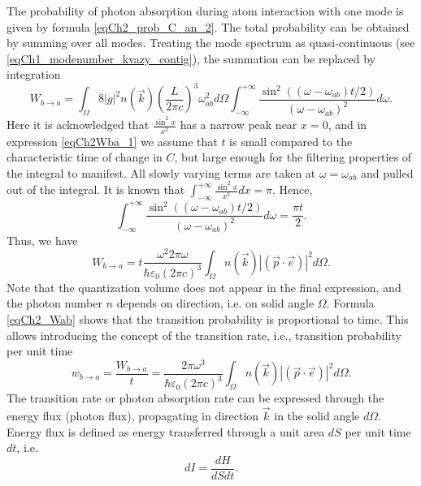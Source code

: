 The probability of photon absorption  during atom interaction with one mode
is given by formula \eqref{eqCh2_prob_C_an_2}. The total probability can
be obtained by summing over all modes. Treating the mode spectrum
as quasi-continuous (see \eqref{eqCh1_modenumber_kvazy_contig}),
the summation can be replaced by integration
\begin{equation}
W_{b \rightarrow a} = \int_{\Omega} 8 \left|g\right|^2 n(\vec{k})
\left(\frac{L}{2 \pi c}\right)^3 \omega_{ab}^2 d \Omega 
\int_{-\infty}^{+\infty} 
\frac{\sin^2\left(\left(\omega - 
  \omega_{ab}\right)t/2\right)} {\left(\omega - 
  \omega_{ab}\right)^2} d \omega.
\label{eqCh2Wba_1}
\end{equation}
Here it is acknowledged that $\frac{\sin^2 x}{x^2}$ has a narrow peak near $x = 0$, and in expression \eqref{eqCh2Wba_1} we assume that $t$ is small compared to the characteristic time of change in $C$, but large enough for the filtering properties of the integral to manifest. All slowly varying terms are taken at $\omega = \omega_{ab}$ and pulled out of the integral. It is known that $\int_{-\infty}^{+\infty} \frac{\sin^2 x}{x^2} dx = \pi$. Hence,
\[
\int_{-\infty}^{+\infty} \frac{\sin^2\left(\left(\omega - 
  \omega_{ab}\right)t/2\right)} {\left(\omega - 
  \omega_{ab}\right)^2} d \omega = \frac{\pi t }{2}.
\]
Thus, we have   
\begin{equation}
W_{b \rightarrow a} = t \frac{\omega^2 2 \pi \omega}
{\hbar \varepsilon_0 \left(2 \pi c\right)^3}\int_{\Omega} 
n(\vec{k})\left|\left(\vec{p} \cdot \vec{e}\right)\right|^2
d \Omega.
\label{eqCh2_Wab} 
\end{equation}
Note that the quantization volume does not appear in the final expression,
and the photon number $n$ depends on direction, i.e. on solid angle $\Omega$. Formula \eqref{eqCh2_Wab} shows that the transition probability 
is proportional to time. This allows introducing the concept of the transition rate, i.e., transition probability per unit time
\begin{equation}
w_{b \rightarrow a} = \frac{W_{b \rightarrow a}}{t} = \frac{2 \pi
  \omega^3 }  
{\hbar \varepsilon_0 \left(2 \pi c\right)^3}\int_{\Omega} 
n(\vec{k}) \left|\left(\vec{p} \cdot \vec{e}\right)\right|^2
d \Omega.
\label{eqCh2_wab} 
\end{equation}
The transition rate or photon absorption rate can be expressed
\cite{bLuisell1972} through the energy flux (photon flux),
propagating in direction $\vec{k}$ in  
the solid angle $d \Omega$. Energy flux is defined as energy
transferred through a unit area $dS$ per unit time $dt$, i.e.
\[
d I = \frac{dH}{dS dt}.
\]


